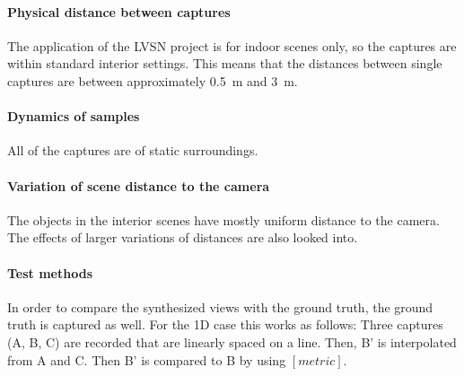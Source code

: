 \paragraph{Physical distance between captures}
The application of the LVSN project is for indoor scenes only, so the captures are within standard interior settings. This means that the distances between single captures are between approximately 0.5~m and 3~m.

\paragraph{Dynamics of samples}
All of the captures are of static surroundings.

\paragraph{Variation of scene distance to the camera}
The objects in the interior scenes have mostly uniform distance to the camera. The effects of larger variations of distances are also looked into.

\paragraph{Test methods}
In order to compare the synthesized views with the ground truth, the ground truth is captured as well. For the 1D case this works as follows: Three captures (A, B, C) are recorded that are linearly spaced on a line. Then, B' is interpolated from A and C. Then B' is compared to B by using $[metric]$.



